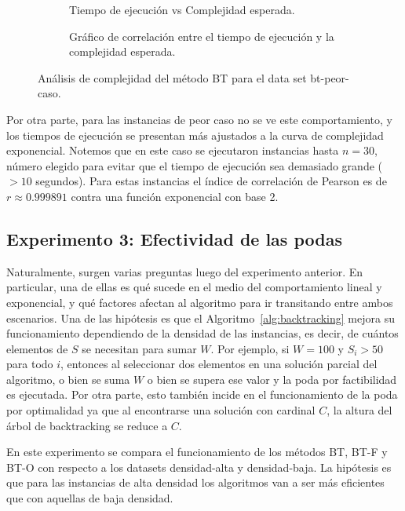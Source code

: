 \documentclass[10pt,a4paper]{article}
\begin{document}
\begin{figure}
    \centering
    \begin{subfigure}{0.45\linewidth}
        \centering
        
        \caption{Tiempo de ejecución vs Complejidad esperada.}
        \label{fig:bt-complejidad-peor-caso-a}
    \end{subfigure}
    \begin{subfigure}{0.45\linewidth}
        \centering
        
        \caption{Gráfico de correlación entre el tiempo de ejecución y la complejidad esperada.}
        \label{fig:bt-complejidad-peor-caso-b}
    \end{subfigure}
    \caption{Análisis de complejidad del método BT para el data set bt-peor-caso.}
    \label{fig:bt-complejidad-peor-caso}
\end{figure}

Por otra parte, para las instancias de peor caso no se ve este comportamiento, y los tiempos de ejecución se presentan más ajustados a la curva de complejidad exponencial. Notemos que en este caso se ejecutaron instancias hasta $n=30$, número elegido para evitar que el tiempo de ejecución sea demasiado grande ($>10$ segundos). Para estas instancias el índice de correlación de Pearson es de $r \approx 0.999891$ contra una función exponencial con base 2.

\subsection{Experimento 3: Efectividad de las podas}
Naturalmente, surgen varias preguntas luego del experimento anterior. En particular, una de ellas es qué sucede en el medio del comportamiento lineal y exponencial, y qué factores afectan al algoritmo para ir transitando entre ambos escenarios. Una de las hipótesis es que el Algoritmo~\ref{alg:backtracking} mejora su funcionamiento dependiendo de la densidad de las instancias, es decir, de cuántos elementos de $S$ se necesitan para sumar $W$. Por ejemplo, si $W = 100$ y $S_i > 50$ para todo $i$, entonces al seleccionar dos elementos en una solución parcial del algoritmo, o bien se suma $W$ o bien se supera ese valor y la poda por factibilidad es ejecutada. Por otra parte, esto también incide en el funcionamiento de la poda por optimalidad ya que al encontrarse una solución con cardinal $C$, la altura del árbol de backtracking se reduce a $C$.

En este experimento se compara el funcionamiento de los métodos BT, BT-F y BT-O con respecto a los datasets densidad-alta y densidad-baja. La hipótesis es que para las instancias de alta densidad los algoritmos van a ser más eficientes que con aquellas de baja densidad.
\end{document}

